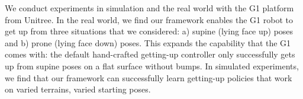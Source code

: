 We conduct experiments in simulation and the real world with the G1 platform
from Unitree. In the real world, we find our framework enables the G1 robot to
get up from three situations that we considered: a) supine (lying face up) poses and b) prone (lying face down) poses.
This expands the capability that the G1 comes with: the default hand-crafted getting-up controller only successfully gets up from supine poses 
on a flat surface without bumps. In simulated experiments, we find that our framework can
successfully learn getting-up policies that work on varied terrains, varied
starting poses.
